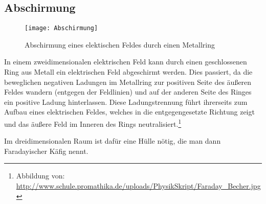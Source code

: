 




%
%	





\subsection{Abschirmung}

\begin{figure}[!h]
	\texttt{[image: Abschirmung]}
	\caption{Abschirmung eines elektischen Feldes durch einen Metallring}
	\label{fig:abschrimung}
\end{figure}

In einem zweidimensionalen elektrischen Feld kann durch einen geschlossenen Ring aus Metall ein elektrischen Feld abgeschirmt werden. Dies passiert, da die beweglichen negativen Ladungen im Metallring zur positiven Seite des äußeren Feldes wandern (entgegen der Feldlinien) und auf der anderen Seite des Ringes ein positive Ladung hinterlassen. Diese Ladungstrennung führt ihrerseits zum Aufbau eines elektrischen Feldes, welches in die entgegengesetzte Richtung zeigt und das \glqq äußere\grqq{} Feld im Inneren des Rings neutralisiert.\footnote{Abbildung von: \url{http://www.schule.promathika.de/uploads/PhysikSkript/Faraday_Becher.jpg}}

Im dreidimensionalen Raum ist dafür eine Hülle nötig, die man dann \glqq Faradayischer Käfig\grqq{} nennt.